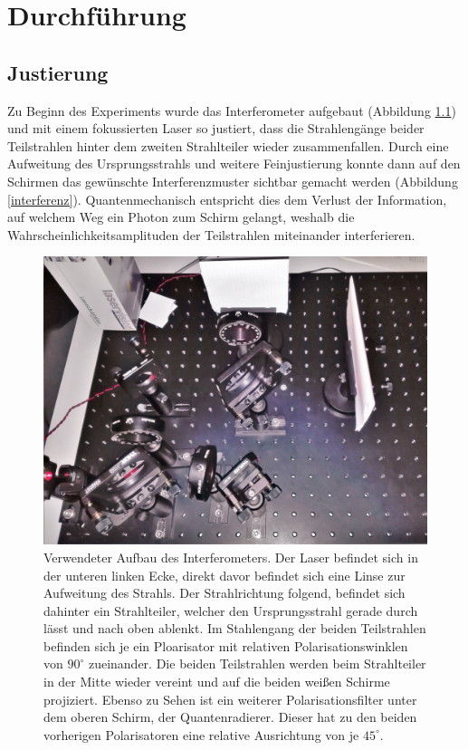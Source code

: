 \documentclass{include/thesisclass3}
\begin{document}
\chapter{Durchführung}
\section{Justierung}
Zu Beginn des Experiments wurde das Interferometer aufgebaut (Abbildung \ref{aufbau}) und mit einem fokussierten Laser so justiert, dass die Strahlengänge beider Teilstrahlen hinter dem zweiten Strahlteiler wieder zusammenfallen. Durch eine Aufweitung des Ursprungsstrahls und weitere Feinjustierung konnte dann auf den Schirmen das gewünschte Interferenzmuster sichtbar gemacht werden (Abbildung \ref{interferenz}). Quantenmechanisch entspricht dies dem Verlust der Information, auf welchem Weg ein Photon zum Schirm gelangt, weshalb die Wahrscheinlichkeitsamplituden der Teilstrahlen miteinander interferieren.
\begin{figure}[H]
\centering
\includegraphics[scale=0.1]{images/eigener-aufbau.jpg}
\caption{Verwendeter Aufbau des Interferometers. Der Laser befindet sich in der unteren linken Ecke, direkt davor befindet sich eine Linse zur Aufweitung des Strahls. Der Strahlrichtung folgend, befindet sich dahinter ein Strahlteiler, welcher den Ursprungsstrahl gerade durch lässt und nach oben ablenkt. Im Stahlengang der beiden Teilstrahlen befinden sich je ein Ploarisator mit relativen Polarisationswinklen von $90^\circ$ zueinander. Die beiden Teilstrahlen werden beim Strahlteiler in der Mitte wieder vereint und auf die beiden weißen Schirme projiziert. Ebenso zu Sehen ist ein weiterer Polarisationsfilter unter dem oberen Schirm, der Quantenradierer. Dieser hat zu den beiden vorherigen Polarisatoren eine relative Ausrichtung von je $45^\circ$.}
\label{aufbau}
\end{figure}
\end{document}
